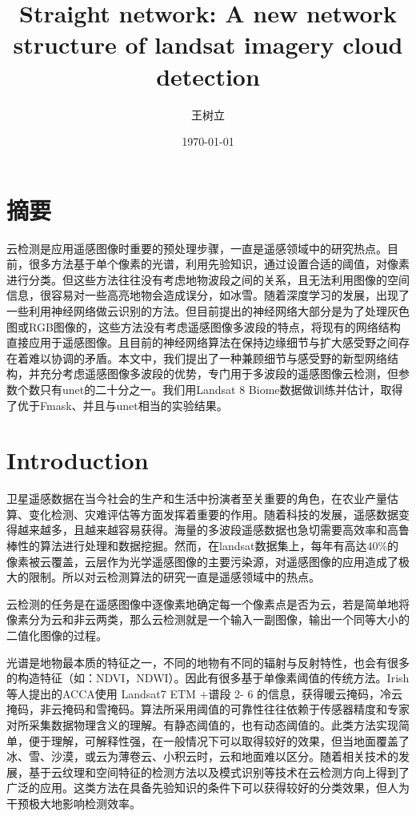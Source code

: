 \documentclass[UTF8]{ctexart}
\begin{document}
\title{Straight network: A new network structure of landsat imagery cloud detection}
\author{王树立}
\date{\today}

\maketitle
\section*{摘要}
云检测是应用遥感图像时重要的预处理步骤，一直是遥感领域中的研究热点。目前，很多方法基于单个像素的光谱，利用先验知识，通过设置合适的阈值，对像素进行分类。但这些方法往往没有考虑地物波段之间的关系，且无法利用图像的空间信息，很容易对一些高亮地物会造成误分，如冰雪。随着深度学习的发展，出现了一些利用神经网络做云识别的方法。但目前提出的神经网络大部分是为了处理灰色图或RGB图像的，这些方法没有考虑遥感图像多波段的特点，将现有的网络结构直接应用于遥感图像。且目前的神经网络算法在保持边缘细节与扩大感受野之间存在着难以协调的矛盾。本文中，我们提出了一种兼顾细节与感受野的新型网络结构，并充分考虑遥感图像多波段的优势，专门用于多波段的遥感图像云检测，但参数个数只有unet的二十分之一。我们用Landsat 8 Biome数据做训练并估计，取得了优于Fmask、并且与unet相当的实验结果。

\section[]{Introduction}
卫星遥感数据在当今社会的生产和生活中扮演者至关重要的角色，在农业产量估算\cite{prasad2006crop}、变化检测\cite{verbesselt2010detecting}、灾难评估\cite{joyce2009review}等方面发挥着重要的作用。随着科技的发展，遥感数据变得越来越多，且越来越容易获得。海量的多波段遥感数据也急切需要高效率和高鲁棒性的算法进行处理和数据挖掘。然而，在landsat数据集上，每年有高达40\%的像素被云覆盖\cite{ju2008availability}，云层作为光学遥感图像的主要污染源，对遥感图像的应用造成了极大的限制。所以对云检测算法的研究一直是遥感领域中的热点。

云检测的任务是在遥感图像中逐像素地确定每一个像素点是否为云，若是简单地将像素分为云和非云两类，那么云检测就是一个输入一副图像，输出一个同等大小的二值化图像的过程。

光谱是地物最本质的特征之一，不同的地物有不同的辐射与反射特性，也会有很多的构造特征（如：NDVI，NDWI）。因此有很多基于单像素阈值的传统方法\cite{sun2018cloud}。Irish等人\cite{irish2006characterization}提出的ACCA使用 Landsat7 ETM +谱段 2- 6 的信息，获得暖云掩码，冷云掩码，非云掩码和雪掩码。算法所采用阈值的可靠性往往依赖于传感器精度和专家对所采集数据物理含义的理解。有静态阈值的，也有动态阈值的。此类方法实现简单，便于理解，可解释性强，在一般情况下可以取得较好的效果，但当地面覆盖了冰、雪、沙漠，或云为薄卷云、小积云时，云和地面难以区分。随着相关技术的发展，基于云纹理和空间特征的检测方法以及模式识别等技术在云检测方向上得到了广泛的应用。这类方法在具备先验知识的条件下可以获得较好的分类效果，但人为干预极大地影响检测效率。
\end{document}

